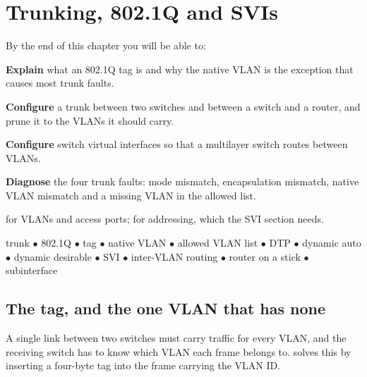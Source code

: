 \chapter{Trunking, 802.1Q and SVIs}\label{ch:trunking}

\begin{outcomes}
By the end of this chapter you will be able to:
\begin{tight}
  \item \textbf{Explain} what an 802.1Q tag is and why the native VLAN is the
        exception that causes most trunk faults.
  \item \textbf{Configure} a trunk between two switches and between a switch and
        a router, and prune it to the VLANs it should carry.
  \item \textbf{Configure} switch virtual interfaces so that a multilayer switch
        routes between VLANs.
  \item \textbf{Diagnose} the four trunk faults: mode mismatch, encapsulation
        mismatch, native VLAN mismatch and a missing VLAN in the allowed list.
\end{tight}
\end{outcomes}

\begin{prereq}
 for VLANs and access ports;  for addressing, which the
SVI section needs.
\end{prereq}

\begin{keyterms}
trunk $\bullet$ 802.1Q $\bullet$ tag $\bullet$ native VLAN $\bullet$ allowed VLAN
list $\bullet$ DTP $\bullet$ dynamic auto $\bullet$ dynamic desirable $\bullet$
SVI $\bullet$ inter-VLAN routing $\bullet$ router on a stick $\bullet$
subinterface
\end{keyterms}

\section{The tag, and the one VLAN that has none}

A single link between two switches must carry traffic for every VLAN, and the
receiving switch has to know which VLAN each frame belongs to. 
solves this by inserting a four-byte tag into the frame carrying the VLAN ID.

